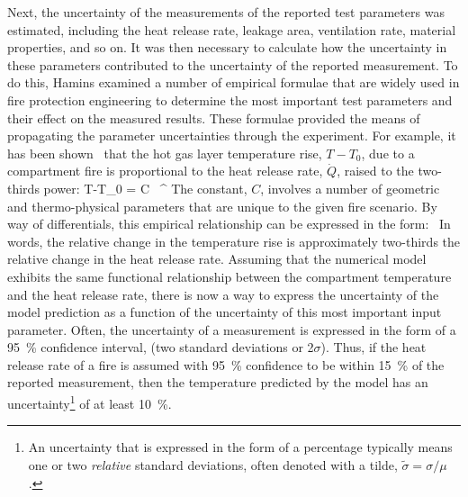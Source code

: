 Next, the
uncertainty of the measurements of the reported test parameters was estimated, including the heat release rate,
leakage area, ventilation rate, material
properties, and so on. It was then necessary to calculate how the uncertainty in these parameters contributed to
the uncertainty of the reported measurement. To do this, Hamins
examined a number of empirical formulae that are widely used in fire protection engineering to determine the
most important test parameters and their effect on the measured results. These formulae provided the means of propagating
the parameter uncertainties through the experiment.
For example, it has been shown~\cite{SFPE:Walton} that the hot gas layer temperature rise, $T-T_0$, due to
a compartment fire is proportional to the heat release rate, $\dot{Q}$, raised to the two-thirds power:
\be T-T_0 = C \, ^{} \ee
The constant, $C$, involves a number of geometric and thermo-physical parameters that are unique to the given
fire scenario. By way of differentials, this empirical relationship can be expressed in the form:
\be {} \approx {} \,   \ee
In words, the relative change in the temperature rise is approximately two-thirds the relative change
in the heat release rate. Assuming that the numerical model exhibits the same functional relationship between the compartment
temperature and the heat release rate, there is now a way to express the uncertainty of the model prediction as a function
of the uncertainty of this most
important input parameter. Often, the uncertainty of a measurement is expressed in the form of a 95~\% confidence interval,
(two standard deviations or 2$\sigma$).
Thus, if the heat release rate of a fire is assumed with 95~\% confidence to be
within 15~\% of the reported measurement, then the temperature
predicted by the model has an uncertainty\footnote{An uncertainty that is expressed in the form of a
percentage typically means one or two {\em relative} standard deviations, often denoted with a tilde,
$\widetilde{\sigma}=\sigma/\mu$.} of at least 10~\%.



